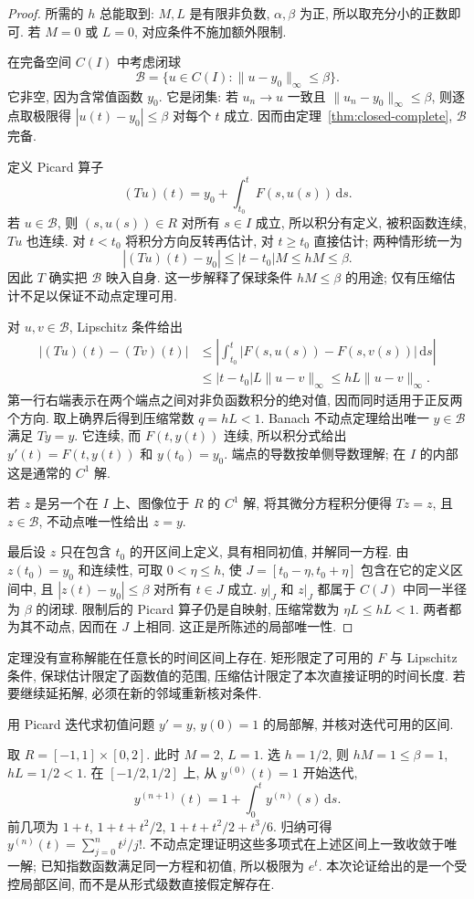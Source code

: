 \begin{proof}
所需的 $h$ 总能取到: $M,L$ 是有限非负数, $\alpha,\beta$ 为正, 所以取充分小的正数即可. 若 $M=0$ 或 $L=0$, 对应条件不施加额外限制.

在完备空间 $C(I)$ 中考虑闭球
\[
\mathcal B=\{u\in C(I):\|u-y_0\|_\infty\leq\beta\}.
\]
它非空, 因为含常值函数 $y_0$. 它是闭集: 若 $u_n\to u$ 一致且 $\|u_n-y_0\|_\infty\leq\beta$, 则逐点取极限得 $|u(t)-y_0|\leq\beta$ 对每个 $t$ 成立. 因而由定理~\ref{thm:closed-complete}, $\mathcal B$ 完备.

定义 Picard 算子
\[
(Tu)(t)=y_0+\int_{t_0}^{t}F(s,u(s))\,\mathrm ds.
\]
若 $u\in\mathcal B$, 则 $(s,u(s))\in R$ 对所有 $s\in I$ 成立, 所以积分有定义, 被积函数连续, $Tu$ 也连续. 对 $t<t_0$ 将积分方向反转再估计, 对 $t\geq t_0$ 直接估计; 两种情形统一为
\[
|(Tu)(t)-y_0|\leq|t-t_0|M\leq hM\leq\beta.
\]
因此 $T$ 确实把 $\mathcal B$ 映入自身. 这一步解释了保球条件 $hM\leq\beta$ 的用途; 仅有压缩估计不足以保证不动点定理可用.

对 $u,v\in\mathcal B$, Lipschitz 条件给出
\begin{align*}
|(Tu)(t)-(Tv)(t)|
&\leq\left|\int_{t_0}^{t}|F(s,u(s))-F(s,v(s))|\,\mathrm ds\right|\\
&\leq |t-t_0|L\|u-v\|_\infty
\leq hL\|u-v\|_\infty.
\end{align*}
第一行右端表示在两个端点之间对非负函数积分的绝对值, 因而同时适用于正反两个方向. 取上确界后得到压缩常数 $q=hL<1$. Banach 不动点定理给出唯一 $y\in\mathcal B$ 满足 $Ty=y$. 它连续, 而 $F(t,y(t))$ 连续, 所以积分式给出
$y'(t)=F(t,y(t))$ 和 $y(t_0)=y_0$. 端点的导数按单侧导数理解; 在 $I$ 的内部这是通常的 $C^1$ 解.

若 $z$ 是另一个在 $I$ 上、图像位于 $R$ 的 $C^1$ 解, 将其微分方程积分便得 $Tz=z$, 且 $z\in\mathcal B$, 不动点唯一性给出 $z=y$.

最后设 $z$ 只在包含 $t_0$ 的开区间上定义, 具有相同初值, 并解同一方程. 由 $z(t_0)=y_0$ 和连续性, 可取 $0<\eta\leq h$, 使 $J=[t_0-\eta,t_0+\eta]$ 包含在它的定义区间中, 且 $|z(t)-y_0|\leq\beta$ 对所有 $t\in J$ 成立. $y|_J$ 和 $z|_J$ 都属于 $C(J)$ 中同一半径为 $\beta$ 的闭球. 限制后的 Picard 算子仍是自映射, 压缩常数为 $\eta L\leq hL<1$. 两者都为其不动点, 因而在 $J$ 上相同. 这正是所陈述的局部唯一性.
\end{proof}

定理没有宣称解能在任意长的时间区间上存在. 矩形限定了可用的 $F$ 与 Lipschitz 条件, 保球估计限定了函数值的范围, 压缩估计限定了本次直接证明的时间长度. 若要继续延拓解, 必须在新的邻域重新核对条件.

\begin{example}
用 Picard 迭代求初值问题 $y'=y$, $y(0)=1$ 的局部解, 并核对迭代可用的区间.
\end{example}
\begin{solution}
取 $R=[-1,1]\times[0,2]$. 此时 $M=2$, $L=1$. 选 $h=1/2$, 则 $hM=1\leq\beta=1$, $hL=1/2<1$. 在 $[-1/2,1/2]$ 上, 从 $y^{(0)}(t)=1$ 开始迭代,
\[
y^{(n+1)}(t)=1+\int_0^t y^{(n)}(s)\,\mathrm ds.
\]
前几项为 $1+t$, $1+t+t^2/2$, $1+t+t^2/2+t^3/6$. 归纳可得
$y^{(n)}(t)=\sum_{j=0}^n t^j/j!$. 不动点定理证明这些多项式在上述区间上一致收敛于唯一解; 已知指数函数满足同一方程和初值, 所以极限为 $e^t$. 本次论证给出的是一个受控局部区间, 而不是从形式级数直接假定解存在.
\end{solution}

